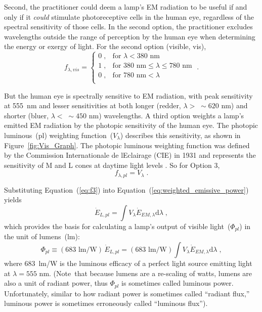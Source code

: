 \documentclass[energies,article,accept,moreauthors,pdftex]{Definitions/mdpi}\usepackage[]{graphicx}\usepackage[]{color}
\newcommand{\del}[1]{}
\newcommand{\enoex}{energy or exergy}
\providecommand{\DIFdelbegin}{} %
\providecommand{\DIFdelend}{} %
\newcommand{\DIFscaledelfig}{0.5}
\newlength{\DIFdelgraphicswidth} %
\newlength{\DIFdelgraphicsheight} %
\newcommand{\DIFdelincludegraphics}[2][]{%
\sbox{\DIFdelgraphicsbox}{\DIFOincludegraphics[#1]{#2}}%
\settoboxwidth{\DIFdelgraphicswidth}{\DIFdelgraphicsbox} %
\settoboxtotalheight{\DIFdelgraphicsheight}{\DIFdelgraphicsbox} %
\scalebox{\DIFscaledelfig}{%
\parbox[b]{\DIFdelgraphicswidth}{\usebox{\DIFdelgraphicsbox}\\[-\baselineskip] \rule{\DIFdelgraphicswidth}{0em}}\llap{\resizebox{\DIFdelgraphicswidth}{\DIFdelgraphicsheight}{%
\setlength{\unitlength}{\DIFdelgraphicswidth}%
\begin{picture}(1,1)%
\thicklines\linethickness{2pt} %
{\color[rgb]{1,0,0}\put(0,0){\framebox(1,1){}}}%
{\color[rgb]{1,0,0}\put(0,0){\line( 1,1){1}}}%
{\color[rgb]{1,0,0}\put(0,1){\line(1,-1){1}}}%
\end{picture}%
}\hspace*{3pt}}} %
} %
\DeclareRobustCommand{\DIFdelbegin}{\DIFOdelbegin \let\includegraphics\DIFdelincludegraphics} %
\DeclareRobustCommand{\DIFdelend}{\DIFOaddend \let\includegraphics\DIFOincludegraphics} %
\begin{document}
Second, the practitioner could 
deem a lamp's EM radiation to be useful if and only if it \emph{could}
stimulate photoreceptive cells in the human eye,
regardless of the spectral sensitivity of those cells.
In the second option, the practitioner excludes wavelengths outside the range of perception by the human eye
when determining the \enoex{} of light.
For the second option (visible, vis),
\begin{equation} \label{eq:f2}
f_{\lambda,vis} =
  \begin{cases}
    0 \; , & \text{for } \lambda < 380 \text{ nm} \\
    1 \; , & \text{for } 380 \text{ nm} \le \lambda \le 780 \text{ nm} \\
    0 \; , & \text{for } 780 \text{ nm} < \lambda \\
  \end{cases} \; .
\end{equation}

But the human eye is spectrally sensitive to EM radiation, 
with peak sensitivity at 555~nm 
\DIFdelbegin %
\DIFdelend and lesser sensitivities at both 
longer (redder, $\lambda > \; \sim{}620 \text{ nm}$) and
shorter (bluer, $\lambda < \; \sim{}450 \text{ nm}$) wavelengths.
A third option weights a lamp's emitted EM radiation 
by the photopic sensitivity of the human eye.
The photopic luminous~(pl) weighting function~($V_\lambda$) describes this sensitivity, 
as shown in Figure~\ref{fig:Vis_Graph}.
The photopic luminous weighting function 
was defined by the Commission Internationale de l\textquotesingle{}Eclairage (CIE) in 1931
and represents the sensitivity of M and L cones
at daytime light levels \cite{CVRL2008}.
So for Option 3,
\begin{equation} \label{eq:f3}
  f_{\lambda,pl} = V_\lambda \; .
\end{equation}

Substituting Equation~(\ref{eq:f3}) into Equation~(\ref{eq:weighted_emissive_power})
yields
\begin{equation}
  \dot{E}_{L,pl} = \int V_\lambda \dot{E}_{EM,\lambda} \mathrm{d}\lambda \; ,
\end{equation}
%
which provides the basis for calculating a lamp's output 
of visible light~($\Phi_{pl}$) in the unit of lumens~(lm):
\begin{equation} \label{eq:lumen}
  \Phi_{pl} \equiv (683 \text{ lm/W}) \, \dot{E}_{L,pl} 
                 = (683 \text{ lm/W}) \int V_\lambda \dot{E}_{EM,\lambda} \mathrm{d}\lambda \; ,
\end{equation}
%
where 683~lm/W is the luminous efficacy of a perfect light source
emitting \DIFdelbegin %
\DIFdelend light at $\lambda = 555 \text{ nm}$.
\mbox{(Note that} because lumens are a re-scaling of watts, 
lumens are also a unit of radiant power, 
thus $\Phi_{pl}$ is sometimes called luminous power. 
Unfortunately, similar to how radiant power is sometimes called ``radiant flux,'' 
luminous power is sometimes erroneously called ``luminous flux'').
\end{document}

